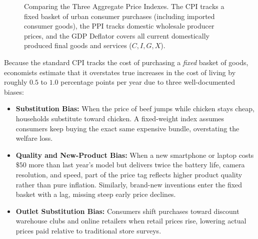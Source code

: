 \documentclass[11pt,letterpaper]{article}
\begin{document}
\begin{figure}[htbp]
\caption{Comparing the Three Aggregate Price Indexes. The CPI tracks a fixed basket of urban consumer purchases (including imported consumer goods), the PPI tracks domestic wholesale producer prices, and the GDP Deflator covers all current domestically produced final goods and services ($C, I, G, X$).}
\label{fig:price_index_scope}
\end{figure}

\begin{coreprinciple}
Because the standard CPI tracks the cost of purchasing a \emph{fixed} basket of goods, economists estimate that it overstates true increases in the cost of living by roughly $0.5$ to $1.0$ percentage points per year due to three well-documented biases:
\begin{itemize}
    \item \textbf{Substitution Bias:} When the price of beef jumps while chicken stays cheap, households substitute toward chicken. A fixed-weight index assumes consumers keep buying the exact same expensive bundle, overstating the welfare loss.
    \item \textbf{Quality and New-Product Bias:} When a new smartphone or laptop costs $\$50$ more than last year's model but delivers twice the battery life, camera resolution, and speed, part of the price tag reflects higher product quality rather than pure inflation. Similarly, brand-new inventions enter the fixed basket with a lag, missing steep early price declines.
    \item \textbf{Outlet Substitution Bias:} Consumers shift purchases toward discount warehouse clubs and online retailers when retail prices rise, lowering actual prices paid relative to traditional store surveys.
\end{itemize}
\end{coreprinciple}
\end{document}
